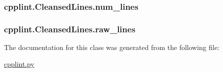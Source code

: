 \subsubsection[{\texorpdfstring{num\+\_\+lines}{num_lines}}]{\setlength{\rightskip}{0pt plus 5cm}cpplint.\+Cleansed\+Lines.\+num\+\_\+lines}\hypertarget{classcpplint_1_1CleansedLines_a4b42ab48659954fb6e0a4e4eb483a45a}{}\label{classcpplint_1_1CleansedLines_a4b42ab48659954fb6e0a4e4eb483a45a}
\subsubsection[{\texorpdfstring{raw\+\_\+lines}{raw_lines}}]{\setlength{\rightskip}{0pt plus 5cm}cpplint.\+Cleansed\+Lines.\+raw\+\_\+lines}\hypertarget{classcpplint_1_1CleansedLines_a9e94ce9e4f682be33c04fe82429c4dfd}{}\label{classcpplint_1_1CleansedLines_a9e94ce9e4f682be33c04fe82429c4dfd}


The documentation for this class was generated from the following file\+:\begin{DoxyCompactItemize}
\item 
\hyperlink{cpplint_8py}{cpplint.\+py}\end{DoxyCompactItemize}
